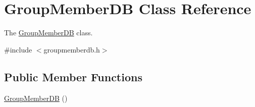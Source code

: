 \hypertarget{classGroupMemberDB}{}\section{Group\+Member\+DB Class Reference}
\label{classGroupMemberDB}


The \hyperlink{classGroupMemberDB}{Group\+Member\+DB} class.  




{\ttfamily \#include $<$groupmemberdb.\+h$>$}

\subsection*{Public Member Functions}
\begin{DoxyCompactItemize}
\item 
\hyperlink{classGroupMemberDB_a2b723703e4b30c4876fb02b62813a88a}{Group\+Member\+DB} ()\hypertarget{classGroupMemberDB_a2b723703e4b30c4876fb02b62813a88a}{}\label{classGroupMemberDB_a2b723703e4b30c4876fb02b62813a88a}


\end{DoxyCompactItemize}
